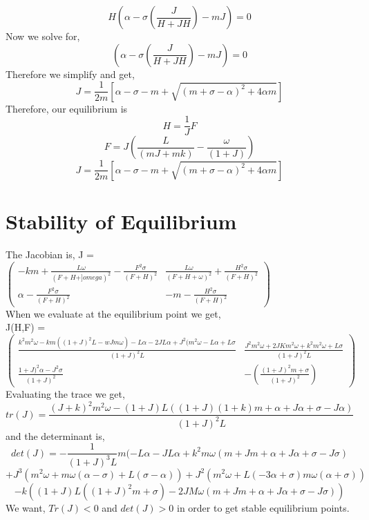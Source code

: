 \documentclass[a4paper,10pt]{article}
\begin{document}
\begin{displaymath}
H(\alpha -\sigma(\frac{J}{H+JH})-mJ) = 0
\end{displaymath}
Now we solve for,
\begin{displaymath}
(\alpha -\sigma(\frac{J}{H+JH})-mJ) = 0
\end{displaymath}
Therefore we simplify and get,
\begin{displaymath}
J = \frac{1}{2m}[\alpha-\sigma-m+\sqrt{(m+\sigma-\alpha)^2+4\alpha m}]
\end{displaymath}
Therefore, our equilibrium is 
 \begin{displaymath}
H = \frac{1}{J}F
\end{displaymath}
\begin{displaymath}
F = J (\frac{L}{(mJ+mk)} - \frac{\omega}{(1+J)})
\end{displaymath}
\begin{displaymath}
J = \frac{1}{2m}[\alpha-\sigma-m+\sqrt{(m+\sigma-\alpha)^2+4\alpha m}]
\end{displaymath}
\section{Stability of Equilibrium}
The Jacobian is,
J = $\begin{pmatrix}
-km + \frac{L\omega}{(F+H+]omega)^2}-\frac{F^2\sigma}{(F+H)^2} & \frac{L\omega}{(F+H+\omega)^2}+\frac{H^2\sigma}{(F+H)^2} \\
\alpha -\frac{F^2\sigma}{(F+H)^2} & -m-\frac{H^2\sigma}{(F+H)^2}
\end{pmatrix}$\\
When we evaluate at the equilibrium point we get, \\
J(H,F) = $\begin{pmatrix}
\frac{k^2m^2\omega -km((1+J)^2L-wJm\omega)-L\alpha-2JL\alpha+J^2(m^2\omega-L\alpha+L\sigma}{(1+J)^2L} & \frac{J^2m^2\omega+2JKm^2\omega+k^2m^2\omega+L\sigma}{(1+J)^2L} \\
\frac{1+J)^2\alpha-J^2\sigma}{(1+J)^2} & -(\frac{(1+J)^2m+\sigma}{(1+J)^2})
\end{pmatrix}$\\
Evaluating the trace we get,
\begin{displaymath}
tr(J) =\frac{(J+k)^2m^2\omega - (1+J)L((1+J)(1+k)m+\alpha+J\alpha + \sigma - J\alpha)}{(1+J)^2L} 
\end{displaymath}
and the determinant is, 
\begin{displaymath}
det(J) = -\frac{1}{(1+J)^3L}m(-L\alpha - JL\alpha + k^2m\omega (m+Jm+\alpha+J\alpha+\sigma-J\sigma)
\end{displaymath}
\begin{displaymath}
+J^3(m^2\omega+m\omega (\alpha - \sigma)+L(\sigma-\alpha))+J^2(m^2\omega+L(-3\alpha+\sigma)m\omega(\alpha+\sigma))
\end{displaymath}
\begin{displaymath}
-k((1+J)L((1+J)^2m+\sigma)-2JM\omega(m+Jm+\alpha+J\alpha +\sigma-J\sigma))
\end{displaymath}
We want, $Tr(J)<0$ and $det(J)>0$ in order to get stable equilibrium points.
\end{document}
